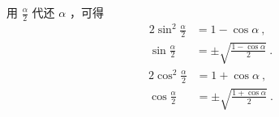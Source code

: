 用 $\frac{\alpha}{2}$ 代还 $\alpha$ ，可得
\begin{equation}
\begin{aligned}
2\sin^2\frac{\alpha}{2} &= 1 - \cos\alpha~,\\
\sin\frac{\alpha}{2}&= \pm\sqrt{\frac{1-\cos\alpha}{2}}~.
\end{aligned}
\end{equation}
\begin{equation}
\begin{aligned}
2\cos^2\frac{\alpha}{2} &= 1 + \cos\alpha~,\\
\cos\frac{\alpha}{2} &= \pm\sqrt{\frac{1+\cos\alpha}{2}}~.
\end{aligned}
\end{equation}
